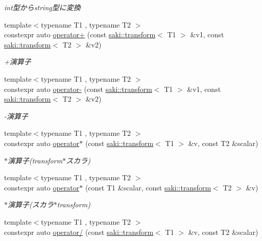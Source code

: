 \begin{DoxyCompactItemize}
\begin{DoxyCompactList}\small\item\em int型からstring型に変換 \end{DoxyCompactList}\item 
{\footnotesize template$<$typename T1 , typename T2 $>$ }\\constexpr auto \mbox{\hyperlink{namespacesaki_a8f643bf5bc8002b1fefb916ff9c1d56a}{operator+}} (const \mbox{\hyperlink{classsaki_1_1transform}{saki\+::transform}}$<$ T1 $>$ \&v1, const \mbox{\hyperlink{classsaki_1_1transform}{saki\+::transform}}$<$ T2 $>$ \&v2)
\begin{DoxyCompactList}\small\item\em +演算子 \end{DoxyCompactList}\item 
{\footnotesize template$<$typename T1 , typename T2 $>$ }\\constexpr auto \mbox{\hyperlink{namespacesaki_a1a8b351ef2a4ccd991bc774540619b3a}{operator-\/}} (const \mbox{\hyperlink{classsaki_1_1transform}{saki\+::transform}}$<$ T1 $>$ \&v1, const \mbox{\hyperlink{classsaki_1_1transform}{saki\+::transform}}$<$ T2 $>$ \&v2)
\begin{DoxyCompactList}\small\item\em -\/演算子 \end{DoxyCompactList}\item 
{\footnotesize template$<$typename T1 , typename T2 $>$ }\\constexpr auto \mbox{\hyperlink{namespacesaki_ab9612151e27555ea59013c6a7da3322d}{operator$\ast$}} (const \mbox{\hyperlink{classsaki_1_1transform}{saki\+::transform}}$<$ T1 $>$ \&v, const T2 \&scalar)
\begin{DoxyCompactList}\small\item\em $\ast$演算子(transform$\ast$スカラ) \end{DoxyCompactList}\item 
{\footnotesize template$<$typename T1 , typename T2 $>$ }\\constexpr auto \mbox{\hyperlink{namespacesaki_a9f06bb4644df2b78c5032c0656472d4c}{operator$\ast$}} (const T1 \&scalar, const \mbox{\hyperlink{classsaki_1_1transform}{saki\+::transform}}$<$ T2 $>$ \&v)
\begin{DoxyCompactList}\small\item\em $\ast$演算子(スカラ$\ast$transform) \end{DoxyCompactList}\item 
{\footnotesize template$<$typename T1 , typename T2 $>$ }\\constexpr auto \mbox{\hyperlink{namespacesaki_aae41cae2f869873e083124ad5f1b5f67}{operator/}} (const \mbox{\hyperlink{classsaki_1_1transform}{saki\+::transform}}$<$ T1 $>$ \&v, const T2 \&scalar)

\end{DoxyCompactItemize}

